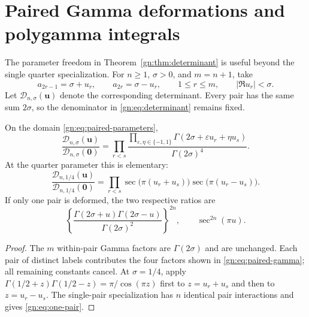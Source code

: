 \section{Paired Gamma deformations and polygamma integrals}
\label{gn:sec:paired}

The parameter freedom in Theorem~\ref{gn:thm:determinant} is useful
beyond the single quarter specialization.  For $n\ge1$, $\sigma>0$,
and $m=n+1$, take
\begin{equation}\label{gn:eq:paired-parameters}
 a_{2r-1}=\sigma+u_r,\qquad a_{2r}=\sigma-u_r,
 \qquad 1\le r\le m,\qquad |\Re u_r|<\sigma.
\end{equation}
Let $\mathcal D_{n,\sigma}(\mathbf u)$ denote the corresponding
determinant.  Every pair has the same sum $2\sigma$, so the denominator
in \eqref{gn:eq:determinant} remains fixed.

\begin{theorem}
\label{gn:thm:paired}
On the domain \eqref{gn:eq:paired-parameters},
\begin{equation}\label{gn:eq:paired-gamma}
 \boxed{\displaystyle
 \frac{\mathcal D_{n,\sigma}(\mathbf u)}
      {\mathcal D_{n,\sigma}(\mathbf0)}
 =\prod_{r<s}
   \frac{\displaystyle\prod_{\varepsilon,\eta\in\{-1,1\}}
          \Gamma(2\sigma+\varepsilon u_r+\eta u_s)}
        {\Gamma(2\sigma)^4}.}
\end{equation}
At the quarter parameter this is elementary:
\begin{equation}\label{gn:eq:paired-sec}
 \boxed{\displaystyle
 \frac{\mathcal D_{n,1/4}(\mathbf u)}
      {\mathcal D_{n,1/4}(\mathbf0)}
 =\prod_{r<s}\sec\bigl(\pi(u_r+u_s)\bigr)
                 \sec\bigl(\pi(u_r-u_s)\bigr).}
\end{equation}
If only one pair is deformed, the two respective ratios are
\begin{equation}\label{gn:eq:one-pair}
 \left\{\frac{\Gamma(2\sigma+u)\Gamma(2\sigma-u)}
                    {\Gamma(2\sigma)^2}\right\}^{2n},
 \qquad \sec^{2n}(\pi u).
\end{equation}
\end{theorem}

\begin{proof}
The $m$ within-pair Gamma factors are $\Gamma(2\sigma)$ and are
unchanged.  Each pair of distinct labels contributes the four factors
shown in \eqref{gn:eq:paired-gamma}; all remaining constants cancel.
At $\sigma=1/4$, apply
$\Gamma(1/2+z)\Gamma(1/2-z)=\pi/\cos(\pi z)$ first to
$z=u_r+u_s$ and then to $z=u_r-u_s$.  The single-pair specialization
has $n$ identical pair interactions and gives \eqref{gn:eq:one-pair}.
\end{proof}

